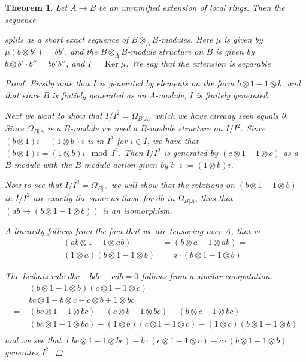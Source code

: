 \documentclass[11pt, a4paper, english]{article}
\numberwithin{prop}{section}
\numberwithin{lemma}{section}
\newtheorem{theorem}{Theorem}
\numberwithin{theorem}{section}
\numberwithin{defin}{section}
\numberwithin{example}{section}
\DeclareMathOperator{\Ker}{Ker}
\begin{document}
\begin{theorem}
\label{thm:unramified_implies_seperable}
Let $A \to B$ be an unramified extension of local rings. Then the sequence
\begin{center}
\end{center}
splits as a short exact sequence of $B\otimes_AB$-modules. Here $\mu$ is given by $\mu(b \otimes b') = bb'$, and the $B \otimes_A B$-module structure on $B$ is given by $b \otimes b' \cdot b'' = bb'b''$, and $I = \Ker \mu$. We say that the extension is separable

\begin{proof}
Firstly note that $I$ is generated by elements on the form $b \otimes 1 - 1 \otimes b$, and that since $B$ is fintiely generated as an $A$-module, $I$ is finitely generated.

Next we want to show that $I/I^2 = \Omega_{B|A}$, which we have already seen equals 0. Since $\Omega_{B|A}$ is a $B$-module we need a $B$-module structure on $I/I^2$. Since $(b \otimes 1)i - (1\otimes b)i$ is in $I^2$ for $i \in I$, we have that $(b \otimes 1)i = (1 \otimes b)i \mod I^2$. Then $I/I^2$ is generated by $(c \otimes 1 - 1 \otimes c)$ as a $B$-module with the $B$-module action given by $b \cdot i := (1 \otimes b)i$.

Now to see that $I/I^2 = \Omega_{B|A}$ we will show that the relations on $(b \otimes 1 - 1 \otimes b)$ in $I/I^2$ are exactly the same as those for $db$ in $\Omega_{B|A}$, thus that $(db \mapsto (b \otimes 1 - 1 \otimes b))$ is an isomorphism.

$A$-linearity follows from the fact that we are tensoring over $A$, that is
\begin{align*}
(ab \otimes 1 - 1 \otimes ab) &= (b \otimes a - 1 \otimes ab) =\\ 
(1 \otimes a)(b \otimes 1 - 1 \otimes b) &= a \cdot 
(b \otimes 1 - 1 \otimes b)
\end{align*}

The Leibniz rule $dbc - bdc - cdb = 0$ follows from a similar computation.
\begin{align*}
& \;(b \otimes 1 - 1 \otimes b)(c \otimes 1 - 1 \otimes c) \\
=&\; bc \otimes 1 - b \otimes c - c \otimes b + 1 \otimes bc \\
=&\; (bc \otimes 1 - 1 \otimes bc) - (c \otimes b - 1 \otimes bc) - (b \otimes c - 1 \otimes bc)\\
=&\; (bc \otimes 1 - 1 \otimes bc) - (1 \otimes b)(c \otimes 1 - 1 \otimes c) - (1 \otimes c)(b \otimes 1 - 1 \otimes b)\\
\end{align*}
and we see that $(bc \otimes 1 - 1 \otimes bc) - b \cdot (c \otimes 1 - 1 \otimes c) - c \cdot (b \otimes 1 - 1 \otimes b)$ generates $I^2$.


\end{proof}
\end{theorem}
\end{document}
